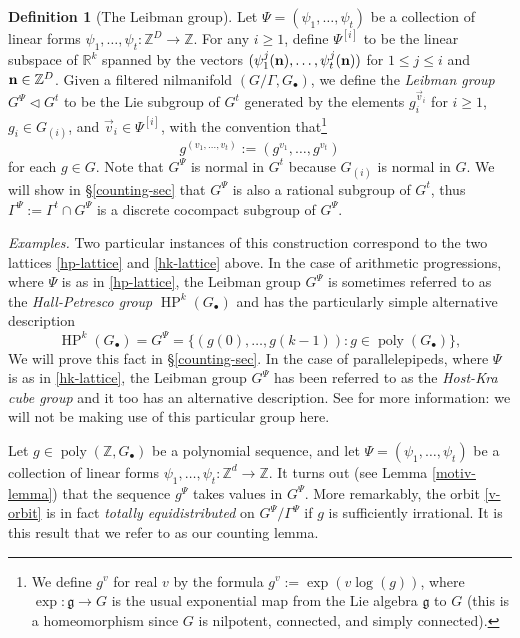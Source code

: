 \documentclass[11pt,reqno]{amsart}
\numberwithin{equation}{section}
\theoremstyle{plain}
\theoremstyle{definition}
\newtheorem{definition}[subsection]{Definition}
\renewcommand{\leq}{\leqslant}
\renewcommand{\geq}{\geqslant}
\newcommand\Z{\mathbb{Z}}
\newcommand\R{\mathbb{R}}
\newcommand\1{{\bf 1}}
\newcommand\2{{\bf 2}}
\newcommand\HP{\operatorname{HP}}
\newcommand\poly{\operatorname{poly}}
\begin{document}
\begin{definition}[The Leibman group]\label{leib-gp}  Let $\Psi = (\psi_1,\ldots,\psi_t)$ be a collection of linear forms $\psi_1,\ldots,\psi_t: \Z^D \to \Z$.  For any $i \geq 1$, define $\Psi^{[i]}$ to be the linear subspace of $\R^k$ spanned by the vectors $(\psi_1^j({\bf n}),\ldots,\psi_t^j({\bf n}))$ for $1 \leq j \leq i$ and ${\bf n} \in \Z^D$. Given a filtered nilmanifold $(G/\Gamma, G_\bullet)$, we define the \emph{Leibman group} $G^{\Psi} \lhd G^t$ to be the Lie subgroup of $G^t$ generated by the elements $g_i^{\vec v_i}$ for $i \geq 1$, $g_i \in G_{(i)}$, and $\vec v_i \in {\Psi}^{[i]}$, with the convention that\footnote{We define $g^v$ for real $v$ by the formula $g^v := \exp( v \log(g) )$, where $\exp: {\mathfrak g} \to G$ is the usual exponential map from the Lie algebra ${\mathfrak g}$ to $G$ (this is a homeomorphism since $G$ is nilpotent, connected, and simply connected).}
$$ g^{(v_1,\ldots,v_t)} := (g^{v_1},\ldots,g^{v_t})$$ 
for each $g \in G$.  Note that $G^{\Psi}$ is normal in $G^t$ because $G_{(i)}$ is normal in $G$.
We will show in \S \ref{counting-sec} that $G^{\Psi}$ is also a rational subgroup of $G^t$, thus $\Gamma^{\Psi} := \Gamma^t \cap G^{\Psi}$ is a discrete cocompact subgroup of $G^{\Psi}$.
\end{definition}

\emph{Examples. }Two particular instances of this construction correspond to the two lattices \eqref{hp-lattice} and \eqref{hk-lattice} above. In the case of arithmetic progressions, where $\Psi$ is as in \eqref{hp-lattice}, the Leibman group $G^{\Psi}$ is sometimes referred to as the \emph{Hall-Petresco group} $\HP^k(G_{\bullet})$ and has the particularly simple alternative description
\[ \HP^k(G_{\bullet}) = G^{\Psi} = \{ (g(0),\dots, g(k-1)) : g \in \poly(G_{\bullet})\},\] 
We will prove this fact in \S \ref{counting-sec}. 
In the case of parallelepipeds, where $\Psi$ is as in \eqref{hk-lattice}, the Leibman group $G^{\Psi}$ has been referred to as the \emph{Host-Kra cube group} \cite{green-tao-linearprimes} and it too has an alternative description. See \cite[Appendix E]{green-tao-linearprimes} for more information: we will not be making use of this particular group here.

Let $g \in \poly(\Z, G_\bullet)$ be a polynomial sequence, and let $\Psi = (\psi_1,\ldots,\psi_t)$ be a collection of linear forms $\psi_1,\ldots,\psi_t: \Z^d \to \Z$.  It turns out (see Lemma \ref{motiv-lemma}) that the sequence $g^\Psi$ takes values in $G^\Psi$.  More remarkably,  the orbit \eqref{v-orbit} is in fact \emph{totally equidistributed} on $G^{\Psi}/\Gamma^{\Psi}$ if $g$ is sufficiently irrational. It is this result that we refer to as our counting lemma.
\end{document}
